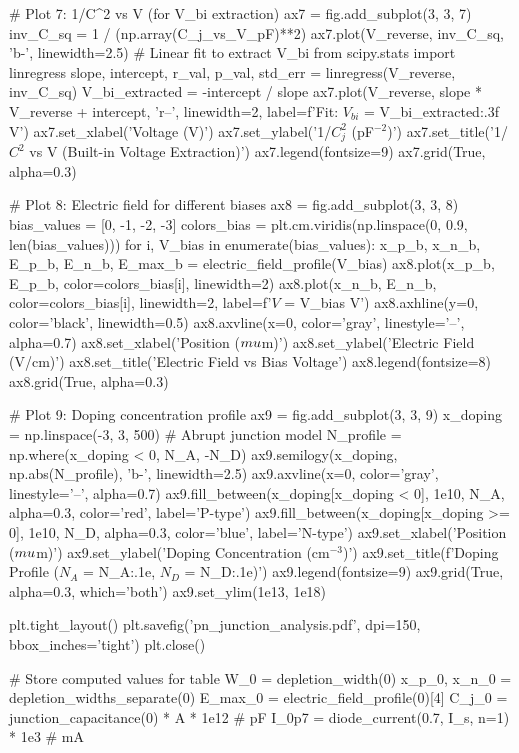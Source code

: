\documentclass[a4paper, 11pt]{article}
\begin{document}
\begin{pycode}
# Plot 7: 1/C^2 vs V (for V_bi extraction)
ax7 = fig.add_subplot(3, 3, 7)
inv_C_sq = 1 / (np.array(C_j_vs_V_pF)**2)
ax7.plot(V_reverse, inv_C_sq, 'b-', linewidth=2.5)
# Linear fit to extract V_bi
from scipy.stats import linregress
slope, intercept, r_val, p_val, std_err = linregress(V_reverse, inv_C_sq)
V_bi_extracted = -intercept / slope
ax7.plot(V_reverse, slope * V_reverse + intercept, 'r--', linewidth=2,
         label=f'Fit: $V_{{bi}}$ = {V_bi_extracted:.3f} V')
ax7.set_xlabel('Voltage (V)')
ax7.set_ylabel('1/$C_j^2$ (pF$^{-2}$)')
ax7.set_title('1/$C^2$ vs V (Built-in Voltage Extraction)')
ax7.legend(fontsize=9)
ax7.grid(True, alpha=0.3)

# Plot 8: Electric field for different biases
ax8 = fig.add_subplot(3, 3, 8)
bias_values = [0, -1, -2, -3]
colors_bias = plt.cm.viridis(np.linspace(0, 0.9, len(bias_values)))
for i, V_bias in enumerate(bias_values):
    x_p_b, x_n_b, E_p_b, E_n_b, E_max_b = electric_field_profile(V_bias)
    ax8.plot(x_p_b, E_p_b, color=colors_bias[i], linewidth=2)
    ax8.plot(x_n_b, E_n_b, color=colors_bias[i], linewidth=2,
             label=f'$V$ = {V_bias} V')
ax8.axhline(y=0, color='black', linewidth=0.5)
ax8.axvline(x=0, color='gray', linestyle='--', alpha=0.7)
ax8.set_xlabel('Position ($\\mu$m)')
ax8.set_ylabel('Electric Field (V/cm)')
ax8.set_title('Electric Field vs Bias Voltage')
ax8.legend(fontsize=8)
ax8.grid(True, alpha=0.3)

# Plot 9: Doping concentration profile
ax9 = fig.add_subplot(3, 3, 9)
x_doping = np.linspace(-3, 3, 500)
# Abrupt junction model
N_profile = np.where(x_doping < 0, N_A, -N_D)
ax9.semilogy(x_doping, np.abs(N_profile), 'b-', linewidth=2.5)
ax9.axvline(x=0, color='gray', linestyle='--', alpha=0.7)
ax9.fill_between(x_doping[x_doping < 0], 1e10, N_A, alpha=0.3, color='red', label='P-type')
ax9.fill_between(x_doping[x_doping >= 0], 1e10, N_D, alpha=0.3, color='blue', label='N-type')
ax9.set_xlabel('Position ($\\mu$m)')
ax9.set_ylabel('Doping Concentration (cm$^{-3}$)')
ax9.set_title(f'Doping Profile ($N_A$ = {N_A:.1e}, $N_D$ = {N_D:.1e})')
ax9.legend(fontsize=9)
ax9.grid(True, alpha=0.3, which='both')
ax9.set_ylim(1e13, 1e18)

plt.tight_layout()
plt.savefig('pn_junction_analysis.pdf', dpi=150, bbox_inches='tight')
plt.close()

# Store computed values for table
W_0 = depletion_width(0)
x_p_0, x_n_0 = depletion_widths_separate(0)
E_max_0 = electric_field_profile(0)[4]
C_j_0 = junction_capacitance(0) * A * 1e12  # pF
I_0p7 = diode_current(0.7, I_s, n=1) * 1e3  # mA

\end{pycode}
\end{document}
